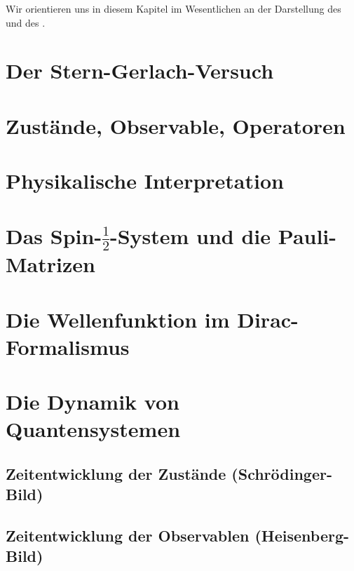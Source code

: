 Wir orientieren uns in diesem Kapitel im Wesentlichen an der Darstellung des \textcite{Sakurai1994Modern} und des \textcite{Nolting2004Grundkurs}.

\section{Der Stern-Gerlach-Versuch}




\section{Zust\"ande, Observable, Operatoren}



\section{Physikalische Interpretation}

\section{Das Spin-$\frac{1}{2}$-System und die Pauli-Matrizen}

\section{Die Wellenfunktion im Dirac-Formalismus}

\section{Die Dynamik von Quantensystemen}
\subsection{Zeitentwicklung der Zust\"ande (Schr\"odinger-Bild)}

\subsection{Zeitentwicklung der Observablen (Heisenberg-Bild)}